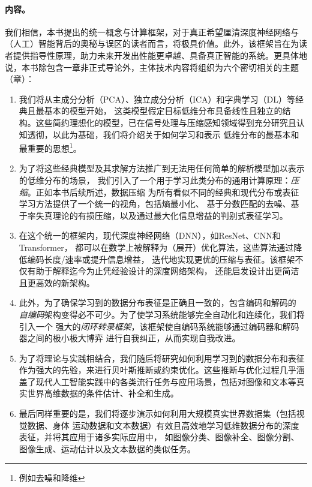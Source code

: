 \documentclass[../../book-main_zh.tex]{subfiles}
\begin{document}
\paragraph{内容。}
我们相信，本书提出的统一概念与计算框架，对于真正希望厘清深度神经网络与（人工）智能背后的奥秘与误区的读者而言，将极具价值。此外，该框架旨在为读者提供指导性原理，助力未来开发出性能更卓越、具备真正智能的系统。更具体地说，本书除包含一章非正式导论外，主体技术内容将组织为六个密切相关的主题（章）：
\begin{enumerate}
    \item 我们将从主成分分析（PCA）、独立成分分析（ICA）和字典学习（DL）等经典且最基本的模型开始，
        这类模型假定目标低维分布具备线性且独立的结构。这些简约理想化的模型，已在信号处理与压缩感知领域得到充分研究且认知透彻，以此为基础，我们将介绍关于如何学习和表示
        低维分布的最基本和最重要的思想\footnote{例如去噪和降维}。

    \item 为了将这些经典模型及其求解方法推广到无法用任何简单的解析模型加以表示的低维分布的场景，
        我们引入了一个用于学习此类分布的通用计算原理：{\em 压缩}。正如本书后续所述，数据压缩
        为所有看似不同的经典和现代分布或表征学习方法提供了一个统一的视角，包括熵最小化、
        基于分数匹配的去噪、基于率失真理论的有损压缩，以及通过最大化信息增益的判别式表征学习。

    \item 在这个统一的框架内，现代深度神经网络（DNN），如ResNet、CNN和Transformer，
        都可以在数学上被解释为（展开）优化算法，这些算法通过降低编码长度/速率或提升信息增益，
        迭代地实现更优的压缩与表征。该框架不仅有助于解释迄今为止凭经验设计的深度网络架构，
        还能启发设计出更简洁且更高效的新架构。

    \item 此外，为了确保学习到的数据分布表征是正确且一致的，包含编码和解码的
        {\em 自编码}架构变得必不可少。为了使学习系统能够完全自动化和连续化，我们将引入一个
        强大的{\em 闭环转录框架}，该框架使自编码系统能够通过编码器和解码器之间的极小极大博弈
        进行自我纠正，从而实现自我改进。

    \item 为了将理论与实践相结合，我们随后将研究如何利用学习到的数据分布和表征
        作为强大的先验，来进行贝叶斯推断或约束优化。这些推断与优化过程几乎涵盖了现代人工智能实践中的各类流行任务与应用场景，包括对图像和文本等真实世界高维数据的条件估计、补全和生成。

    \item 最后同样重要的是，我们将逐步演示如何利用大规模真实世界数据集（包括视觉数据、身体
        运动数据和文本数据）有效且高效地学习低维数据分布的深度表征，并将其应用于诸多实际应用中，
        如图像分类、图像补全、图像分割、图像生成、运动估计以及文本数据的类似任务。
\end{enumerate}
\end{document}
